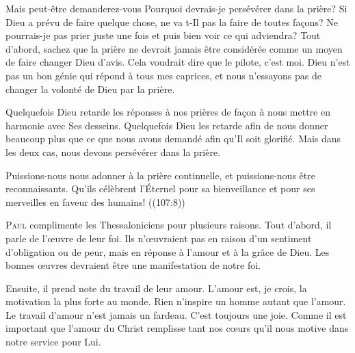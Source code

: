 
Mais peut-être demanderez-vous\frcolon {}
 \Og Pourquoi devrais-je persévérer dans la prière?
 Si Dieu a prévu de faire quelque chose, ne va t-Il pas la faire
 de toutes fa\c{c}ons? Ne pourrais-je pas prier juste une fois et puis bien voir
 ce qui adviendra? \Fg{}
 Tout d'abord, sachez que la prière ne devrait jamais être considérée
 comme un moyen de faire changer Dieu d'avis.
 Cela voudrait dire que le pilote, c'est moi.
 Dieu n'est pas un bon génie qui répond à tous mes caprices,
 et nous n'essayons pas de changer la volonté de Dieu par la prière.

Quelquefois Dieu retarde les réponses à nos prières de fa\c{c}on à nous mettre
 en harmonie avec Ses desseins. Quelquefois Dieu les retarde afin de nous
 donner beaucoup plus que ce que nous avons demandé afin qu'Il soit glorifié.
 Mais dans les deux cas, nous devons persévérer dans la prière.

Puissions-nous nous adonner à la prière continuelle, et puissions-nous
 être reconnaissants.
 \Og Qu'ils célèbrent l'Éternel pour sa bienveillance et pour ses merveilles
 en faveur des humains! \Fg{} ((107:8))

\dvrule






\lettrine{P}{aul} complimente les Thessaloniciens pour plusieurs raisons.
 Tout d'abord, il parle de l'\oe{}uvre de leur foi.
 Ils n'\oe{}uvraient pas en raison d'un sentiment d'obligation ou de peur,
 mais en réponse à l'amour et à la grâce de Dieu.
 Les bonnes \oe{}uvres devraient être une manifestation de notre foi.

Ensuite, il prend note du travail de leur amour. L'amour est, je crois,
 la motivation la plus forte au monde. Rien n'inspire un homme autant
 que l'amour. Le travail d'amour n'est jamais un fardeau.
 C'est toujours une joie. Comme il est important que l'amour du Christ
 remplisse tant nos c\oe{}urs qu'il nous motive dans notre service pour Lui.

